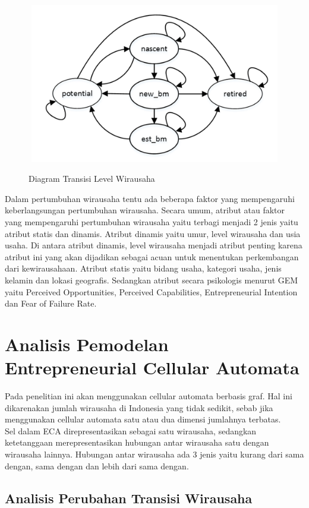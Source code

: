 \begin{figure} [H]
	\centering  
	\includegraphics[width=14cm, height=7cm]{tingkatwirausaha} 
	\label{fig:prosesWirausaha} 
	\caption{Diagram Transisi Level Wirausaha}
\end{figure}


Dalam pertumbuhan wirausaha tentu ada beberapa faktor yang mempengaruhi keberlangsungan pertumbuhan wirausaha. Secara umum, atribut atau faktor yang mempengaruhi pertumbuhan wirausaha yaitu terbagi menjadi 2 jenis yaitu atribut statis dan dinamis. Atribut dinamis yaitu umur, level wirausaha dan usia usaha. Di antara atribut dinamis, level wirausaha menjadi atribut penting karena atribut ini yang akan dijadikan sebagai acuan untuk menentukan perkembangan dari kewirausahaan. Atribut statis yaitu bidang usaha, kategori usaha, jenis kelamin dan lokasi geografis. Sedangkan atribut secara psikologis menurut GEM yaitu Perceived Opportunities, Perceived Capabilities, Entrepreneurial Intention dan Fear of Failure Rate. 


\section{Analisis Pemodelan Entrepreneurial Cellular Automata}
\label{analisisCA}
Pada penelitian ini akan menggunakan cellular automata berbasis graf. Hal ini dikarenakan jumlah wirausaha di Indonesia yang tidak sedikit, sebab jika menggunakan cellular automata satu atau dua dimensi jumlahnya terbatas.\\
Sel dalam ECA direpresentasikan sebagai satu wirausaha, sedangkan ketetanggaan merepresentasikan hubungan antar wirausaha satu dengan wirausaha lainnya. Hubungan antar wirausaha ada 3 jenis yaitu kurang dari sama dengan, sama dengan dan lebih dari sama dengan.

\subsection{Analisis Perubahan Transisi Wirausaha}

